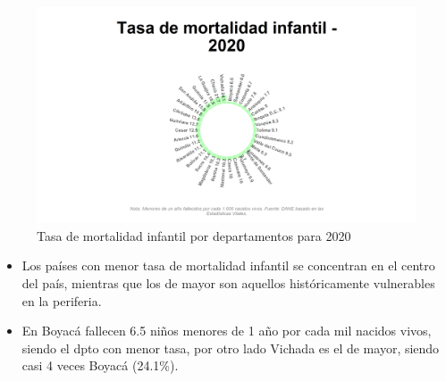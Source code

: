     \begin{figure}[H]
        \caption{Tasa de mortalidad infantil por departamentos para 2020 \label{map_result_2} }
        \begin{center}
        \includegraphics[width=\textwidth,keepaspectratio]{img/var_290_static.png}
        \end{center}
    \end{figure}
            \begin{itemize}
                    \item Los países con menor tasa de mortalidad infantil se concentran en el centro del país, mientras que los de mayor son aquellos históricamente vulnerables en la periferia.
                    \item En Boyacá fallecen 6.5 niños menores de 1 año por cada mil nacidos vivos, siendo el dpto con menor tasa, por otro lado Vichada es el de mayor, siendo casi 4 veces Boyacá (24.1\%).
                    \end{itemize}

